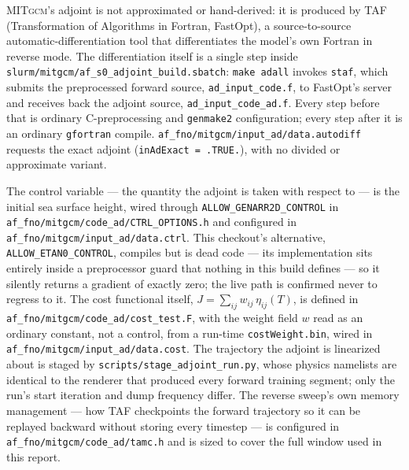 \documentclass[3p,12pt]{elsarticle}
\newcommand{\MITgcm}{\textsc{MITgcm}}
\begin{document}
\MITgcm{}'s adjoint is not approximated or hand-derived: it is produced by
TAF (Transformation of Algorithms in Fortran, FastOpt), a source-to-source
automatic-differentiation tool that differentiates the model's own Fortran in
reverse mode. The differentiation itself is a single step inside
\texttt{slurm/mitgcm/af\_s0\_adjoint\_build.sbatch}: \texttt{make adall}
invokes \texttt{staf}, which submits the preprocessed forward source,
\texttt{ad\_input\_code.f}, to FastOpt's server and receives back the adjoint
source, \texttt{ad\_input\_code\_ad.f}. Every step before that is ordinary
C-preprocessing and \texttt{genmake2} configuration; every step after it is an
ordinary \texttt{gfortran} compile. \texttt{af\_fno/mitgcm/input\_ad/data.autodiff}
requests the exact adjoint (\texttt{inAdExact = .TRUE.}), with no divided or
approximate variant.

The control variable --- the quantity the adjoint is taken with respect to
--- is the initial sea surface height, wired through
\texttt{ALLOW\_GENARR2D\_CONTROL} in
\texttt{af\_fno/mitgcm/code\_ad/\allowbreak CTRL\_OPTIONS.h} and configured in
\texttt{af\_fno/mitgcm/input\_ad/data.ctrl}. This checkout's alternative,
\texttt{ALLOW\_ETAN0\_CONTROL}, compiles but is dead code --- its
implementation sits entirely inside a preprocessor guard that nothing in this
build defines --- so it silently returns a gradient of exactly zero; the live
path is confirmed never to regress to it. The cost functional itself,
$J=\sum_{ij} w_{ij}\,\eta_{ij}(T)$, is defined in
\texttt{af\_fno/mitgcm/code\_ad/cost\_test.F}, with the weight field $w$ read
as an ordinary constant, not a control, from a run-time \texttt{costWeight.bin},
wired in \texttt{af\_fno/mitgcm/input\_ad/data.cost}. The trajectory the
adjoint is linearized about is staged by \texttt{scripts/stage\_adjoint\_run.py},
whose physics namelists are identical to the renderer that produced every
forward training segment; only the run's start iteration and dump frequency
differ. The reverse sweep's own memory management --- how TAF checkpoints the
forward trajectory so it can be replayed backward without storing every
timestep --- is configured in \texttt{af\_fno/mitgcm/code\_ad/tamc.h} and is
sized to cover the full window used in this report.
\end{document}
